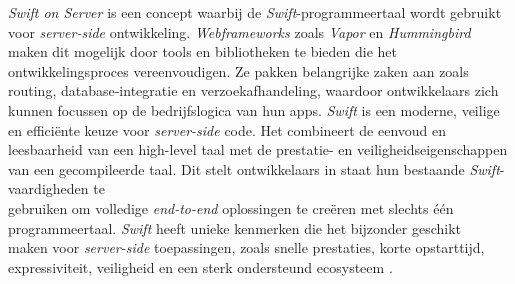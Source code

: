 \textit{Swift on Server} is een concept waarbij de \textit{Swift}-programmeertaal wordt gebruikt voor \textit{server-side} ontwikkeling. \textit{Webframeworks} zoals \textit{Vapor} en \textit{Hummingbird} \\maken dit mogelijk door tools en bibliotheken te bieden die het ontwikkelingsproces vereenvoudigen. Ze pakken belangrijke zaken aan zoals routing, database-integratie en verzoekafhandeling, waardoor ontwikkelaars zich kunnen focussen op de bedrijfslogica van hun apps.
\textit{Swift} is een moderne, veilige en efficiënte keuze voor \textit{server-side} code. Het combineert de eenvoud en leesbaarheid van een high-level taal met de prestatie- en veiligheidseigenschappen van een gecompileerde taal. Dit stelt ontwikkelaars in staat hun bestaande \textit{Swift}-vaardigheden te \\gebruiken om volledige \textit{end-to-end} oplossingen te creëren met slechts één \\programmeertaal. \textit{Swift} heeft unieke kenmerken die het bijzonder geschikt \\maken voor \textit{server-side} toepassingen, zoals snelle prestaties, korte opstarttijd, \\expressiviteit, veiligheid en een sterk ondersteund ecosysteem \autocite{2022}.  \\


